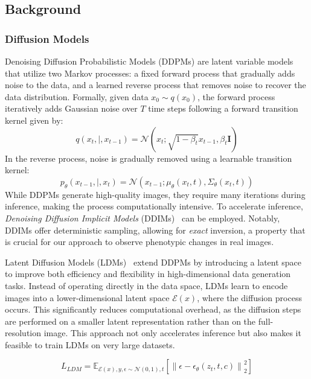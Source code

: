 \subsection{Background}
\subsubsection{Diffusion Models}  Denoising Diffusion Probabilistic Models (DDPMs) are latent variable models that utilize two Markov processes: a fixed forward process that gradually adds noise to the data, and a learned reverse process that removes noise to recover the data distribution. Formally, given data $x_0 \sim q(x_0)$, the forward process iteratively adds Gaussian noise over $T$ time steps following a forward transition kernel given by:
\begin{equation} q(x_t,|,x_{t-1}) = \mathcal{N}\left(x_t; \sqrt{1 - \beta_t} x_{t-1}, \beta_t \mathbf{I}\right) \label{eq2} 
\end{equation}
In the reverse process, noise is gradually removed using a learnable transition kernel: 
\begin{equation} p_{\theta}(x_{t-1},|,x_t) = \mathcal{N}\left(x_{t-1}; \mu_{\theta}(x_t, t), \Sigma_{\theta}(x_t, t)\right) \label{eq3} 
\end{equation}
While DDPMs generate high-quality images, they require many iterations during inference, making the process computationally intensive. To accelerate inference, \textit{Denoising Diffusion Implicit Models} (DDIMs)~\cite{ddim} can be employed. Notably, DDIMs offer deterministic sampling, allowing for \emph{exact} inversion, a property that is crucial for our approach to observe phenotypic changes in real images.

Latent Diffusion Models (LDMs)~\cite{stable_diffusion} extend DDPMs by introducing a latent space to improve both efficiency and flexibility in high-dimensional data generation tasks. Instead of operating directly in the data space, LDMs learn to encode images into a lower-dimensional latent space $\mathcal{E}(x)$, where the diffusion process occurs. This significantly reduces computational overhead, as the diffusion steps are performed on a smaller latent representation rather than on the full-resolution image. This approach not only accelerates inference but also makes it feasible to train LDMs on very large datasets.

\begin{equation}L_{LDM} = \mathbb{E}_{\mathcal{E}(x), y, \epsilon \sim \mathcal{N}(0,1), t} \left[ \left\| \epsilon - \epsilon_\theta \left( z_t, t, c \right) \right\|_2^2 \right]
\end{equation}

